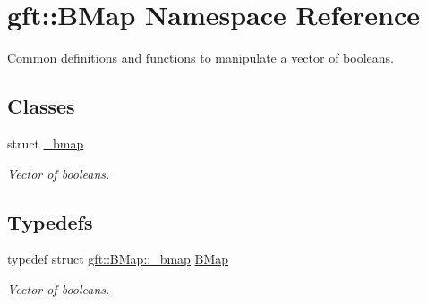 \hypertarget{namespacegft_1_1BMap}{\section{gft\-:\-:B\-Map Namespace Reference}
\label{namespacegft_1_1BMap}
}


Common definitions and functions to manipulate a vector of booleans.  


\subsection*{Classes}
\begin{DoxyCompactItemize}
\item 
struct \hyperlink{structgft_1_1BMap_1_1__bmap}{\-\_\-bmap}
\begin{DoxyCompactList}\small\item\em Vector of booleans. \end{DoxyCompactList}\end{DoxyCompactItemize}
\subsection*{Typedefs}
\begin{DoxyCompactItemize}
\item 
typedef struct \hyperlink{structgft_1_1BMap_1_1__bmap}{gft\-::\-B\-Map\-::\-\_\-bmap} \hyperlink{namespacegft_1_1BMap_a8f2cf1208156e700ed4ee3266e9608a3}{B\-Map}
\begin{DoxyCompactList}\small\item\em Vector of booleans. \end{DoxyCompactList}\end{DoxyCompactItemize}
